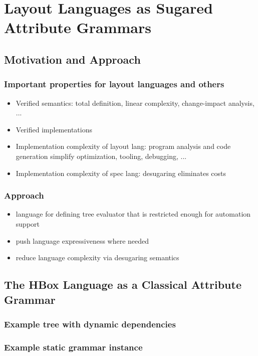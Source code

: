 \chapter{Layout Languages as Sugared Attribute Grammars}
\section{Motivation and Approach}

\subsection{Important properties for layout languages and others}
\begin{itemize}
\item Verified semantics: total definition, linear complexity, change-impact analysis, ...
\item Verified implementations
\item Implementation complexity of layout lang: program analysis and code generation simplify optimization, tooling, debugging, ...
\item Implementation complexity of spec lang: desugaring eliminates costs
\end{itemize}

\subsection{Approach}
\begin{itemize}
\item language for defining tree evaluator that is restricted enough for automation support
\item push language expressiveness where needed
\item reduce language complexity via desugaring semantics
\end{itemize}


\section{The HBox Language as a Classical Attribute Grammar}
\subsection{Example tree with dynamic dependencies}
\subsection{Example static grammar instance}
